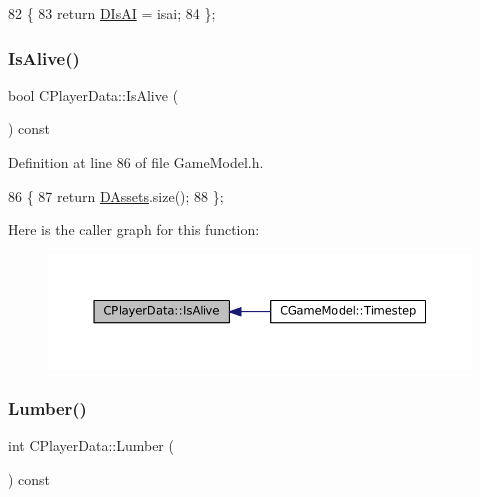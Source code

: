 \begin{DoxyCode}
82                             \{
83             \textcolor{keywordflow}{return} \hyperlink{classCPlayerData_ad3fcb8740d4e37b4654c01c8c595e6d5}{DIsAI} = isai;
84         \};
\end{DoxyCode}
\hypertarget{classCPlayerData_a46ba3f00069e6da5cf4a1203a7456e1d}{}\label{classCPlayerData_a46ba3f00069e6da5cf4a1203a7456e1d} 
\subsubsection{\texorpdfstring{Is\+Alive()}{IsAlive()}}
{\footnotesize\ttfamily bool C\+Player\+Data\+::\+Is\+Alive (\begin{DoxyParamCaption}{ }\end{DoxyParamCaption}) const\hspace{0.3cm}{\ttfamily [inline]}}



Definition at line 86 of file Game\+Model.\+h.


\begin{DoxyCode}
86                             \{
87             \textcolor{keywordflow}{return} \hyperlink{classCPlayerData_a1d7dd355facf52db6242e3554373906c}{DAssets}.size();
88         \};
\end{DoxyCode}
Here is the caller graph for this function\+:
\nopagebreak
\begin{figure}[H]
\begin{center}
\leavevmode
\includegraphics[width=350pt]{classCPlayerData_a46ba3f00069e6da5cf4a1203a7456e1d_icgraph}
\end{center}
\end{figure}
\hypertarget{classCPlayerData_a73b2e6868bd85953604412904a20316a}{}\label{classCPlayerData_a73b2e6868bd85953604412904a20316a} 
\subsubsection{\texorpdfstring{Lumber()}{Lumber()}}
{\footnotesize\ttfamily int C\+Player\+Data\+::\+Lumber (\begin{DoxyParamCaption}{ }\end{DoxyParamCaption}) const\hspace{0.3cm}{\ttfamily [inline]}}




